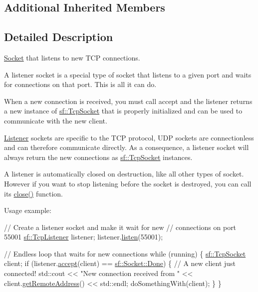 \subsection*{Additional Inherited Members}


\subsection{Detailed Description}
\hyperlink{classsf_1_1_socket}{Socket} that listens to new T\+C\+P connections. 

A listener socket is a special type of socket that listens to a given port and waits for connections on that port. This is all it can do.

When a new connection is received, you must call accept and the listener returns a new instance of \hyperlink{classsf_1_1_tcp_socket}{sf\+::\+Tcp\+Socket} that is properly initialized and can be used to communicate with the new client.

\hyperlink{classsf_1_1_listener}{Listener} sockets are specific to the T\+C\+P protocol, U\+D\+P sockets are connectionless and can therefore communicate directly. As a consequence, a listener socket will always return the new connections as \hyperlink{classsf_1_1_tcp_socket}{sf\+::\+Tcp\+Socket} instances.

A listener is automatically closed on destruction, like all other types of socket. However if you want to stop listening before the socket is destroyed, you can call its \hyperlink{classsf_1_1_tcp_listener_a3a00a850506bd0f9f48867a0fe59556b}{close()} function.

Usage example\+: 
\begin{DoxyCode}
\textcolor{comment}{// Create a listener socket and make it wait for new}
\textcolor{comment}{// connections on port 55001}
\hyperlink{classsf_1_1_tcp_listener}{sf::TcpListener} listener;
listener.\hyperlink{classsf_1_1_tcp_listener_a409d9350d3abfea9636df8cf4a61004e}{listen}(55001);

\textcolor{comment}{// Endless loop that waits for new connections}
\textcolor{keywordflow}{while} (running)
\{
    \hyperlink{classsf_1_1_tcp_socket}{sf::TcpSocket} client;
    \textcolor{keywordflow}{if} (listener.\hyperlink{classsf_1_1_tcp_listener_ae2c83ce5a64d50b68180c46bef0a7346}{accept}(client) == \hyperlink{classsf_1_1_socket_a51bf0fd51057b98a10fbb866246176dca1de3a85bc56d3ae85b3d0f3cfd04ae90}{sf::Socket::Done})
    \{
        \textcolor{comment}{// A new client just connected!}
        std::cout << \textcolor{stringliteral}{"New connection received from "} << client.\hyperlink{classsf_1_1_tcp_socket_a7904ca6ab9e018021e305a3aeb7a1b9a}{getRemoteAddress}() << 
      std::endl;
        doSomethingWith(client);
    \}
\}
\end{DoxyCode}


